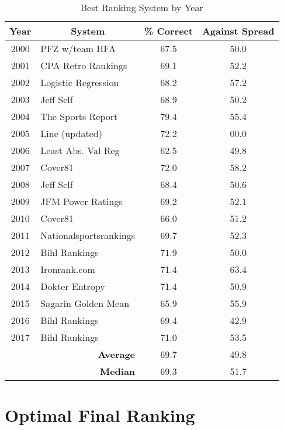 \documentclass[11pt]{article}
\begin{document}
\begin{table}[!htb]
\begin{center}
\scriptsize
\begin{tabular}{|c|l|c|c|}
\hline
Year & \multicolumn{1}{|c|}{System} & \% Correct & Against Spread\\
\hline
2000 & PFZ w/team HFA & 67.5 & 50.0\\
2001 & CPA Retro Rankings & 69.1 & 52.2\\
2002 & Logistic Regression & 68.2 & 57.2\\
2003 & Jeff Self & 68.9 & 50.2\\
2004 & The Sports Report & 79.4 & 55.4\\
2005 & Line (updated) & 72.2 & 00.0\\
2006 & Least Abs. Val Reg & 62.5 & 49.8\\
2007 & Cover81 & 72.0 & 58.2\\
2008 & Jeff Self & 68.4 & 50.6\\
2009 & JFM Power Ratings & 69.2 & 52.1\\
2010 & Cover81 & 66.0 & 51.2\\
2011 & Nationalsportsrankings & 69.7 & 52.3\\
2012 & Bihl Rankings & 71.9 & 50.0\\
2013 & Ironrank.com & 71.4 & 63.4\\
2014 & Dokter Entropy & 71.4 & 50.9\\
2015 & Sagarin Golden Mean & 65.9 & 55.9\\
2016 & Bihl Rankings & 69.4 & 42.9\\
2017 & Bihl Rankings & 71.0 & 53.5\\
\hline
 & \multicolumn{1}{|r|}{\textbf{Average}} & 69.7 & 49.8\\
 & \multicolumn{1}{|r|}{\textbf{Median}} & 69.3 & 51.7\\
\hline
\end{tabular}
\caption{Best Ranking System by Year}\label{table:ranking_year}
\end{center}
\end{table}


\section{Optimal Final Ranking}
\end{document}
